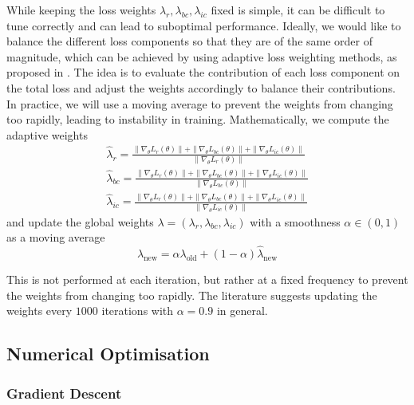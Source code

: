While keeping the loss weights $\lambda_r, \lambda_{bc}, \lambda_{ic}$ fixed is simple, it can be difficult to tune correctly and can lead to suboptimal performance. Ideally, we would like to balance the different loss components so that they are of the same order of magnitude, which can be achieved by using adaptive loss weighting methods, as proposed in \cite{wang2023expert}. The idea is to evaluate the contribution of each loss component on the total loss and adjust the weights accordingly to balance their contributions. In practice, we will use a moving average to prevent the weights from changing too rapidly, leading to instability in training. Mathematically, we compute the adaptive weights
\begin{equation}
    \begin{aligned}
        \hat\lambda_{r} = \frac{\|\nabla_\theta L_{r}(\theta) \| + \|\nabla_\theta L_{bc}(\theta)\|+ \|\nabla_\theta L_{ic}(\theta)\|}{\|\nabla_\theta L_{r}(\theta)\|} \\\hat\lambda_{bc} = \frac{\|\nabla_\theta L_{r}(\theta) \| + \|\nabla_\theta L_{bc}(\theta)\|+ \|\nabla_\theta L_{ic}(\theta)\|}{\|\nabla_\theta L_{bc}(\theta)\|} \\
        \hat\lambda_{ic} = \frac{\|\nabla_\theta L_{r}(\theta) \| + \|\nabla_\theta L_{bc}(\theta)\|+ \|\nabla_\theta L_{ic}(\theta)\|}{\|\nabla_\theta L_{ic}(\theta)\|}
    \end{aligned}
\end{equation}
and update the global weights $\lambda = (\lambda_r, \lambda_{bc}, \lambda_{ic})$ with a smoothness $\alpha \in (0, 1)$ as a moving average
\begin{equation}
    \lambda_\text{new} = \alpha \lambda_\text{old} + (1 - \alpha) \hat \lambda_\text{new}
\end{equation}

This is not performed at each iteration, but rather at a fixed frequency to prevent the weights from changing too rapidly. The literature \cite{wang2023expert} suggests updating the weights every $1000$ iterations with $\alpha=0.9$ in general.

\subsection{Numerical Optimisation}

\subsubsection{Gradient Descent}

